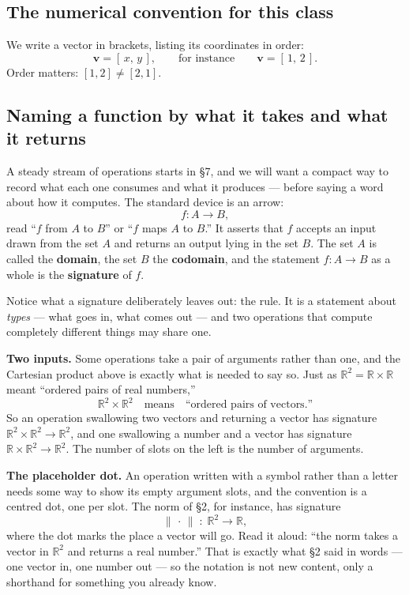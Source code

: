 \documentclass[11pt]{article}
\theoremstyle{definition}
\theoremstyle{remark}
\newcommand{\R}{\mathbb{R}}
\newcommand{\vc}[1]{\mathbf{#1}}
\newcommand{\norm}[1]{\lVert #1\rVert}
\begin{document}
\subsection*{The numerical convention for this class}
We write a vector in brackets, listing its coordinates in order:
\[
  \vc{v}=[\,x,\,y\,],
  \qquad\text{for instance}\qquad
  \vc{v}=[\,1,\,2\,].
\]
Order matters: $[1,2]\neq[2,1]$.

\subsection*{Naming a function by what it takes and what it returns}
A steady stream of operations starts in \S7, and we will want a compact way to
record what each one consumes and what it produces --- before saying a word
about how it computes. The standard device is an arrow:
\[
  f : A \to B ,
\]
read ``$f$ from $A$ to $B$'' or ``$f$ maps $A$ to $B$.'' It asserts that $f$
accepts an input drawn from the set $A$ and returns an output lying in the set
$B$. The set $A$ is called the \textbf{domain}, the set $B$ the
\textbf{codomain}, and the statement $f:A\to B$ as a whole is the
\textbf{signature} of $f$.

Notice what a signature deliberately leaves out: the rule. It is a statement
about \emph{types} --- what goes in, what comes out --- and two operations that
compute completely different things may share one.

\smallskip
\noindent\textbf{Two inputs.} Some operations take a pair of arguments rather
than one, and the Cartesian product above is exactly what is needed to say so.
Just as $\R^{2}=\R\times\R$ meant ``ordered pairs of real numbers,''
\[
  \R^{2}\times\R^{2}
  \quad\text{means}\quad
  \text{``ordered pairs of vectors.''}
\]
So an operation swallowing two vectors and returning a vector has signature
$\R^{2}\times\R^{2}\to\R^{2}$, and one swallowing a number and a vector has
signature $\R\times\R^{2}\to\R^{2}$. The number of slots on the left is the
number of arguments.

\smallskip
\noindent\textbf{The placeholder dot.} An operation written with a symbol rather
than a letter needs some way to show its empty argument slots, and the
convention is a centred dot, one per slot. The norm of \S2, for instance, has
signature
\[
  \norm{\,\cdot\,} \;:\; \R^{2}\to\R ,
\]
where the dot marks the place a vector will go. Read it aloud: ``the norm takes
a vector in $\R^{2}$ and returns a real number.'' That is exactly what \S2 said
in words --- one vector in, one number out --- so the notation is not new
content, only a shorthand for something you already know.
\end{document}
